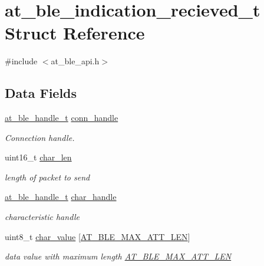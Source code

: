 \hypertarget{structat__ble__indication__recieved__t}{}\section{at\+\_\+ble\+\_\+indication\+\_\+recieved\+\_\+t Struct Reference}
\label{structat__ble__indication__recieved__t}


{\ttfamily \#include $<$at\+\_\+ble\+\_\+api.\+h$>$}

\subsection*{Data Fields}
\begin{DoxyCompactItemize}
\item 
\mbox{\hyperlink{at__ble__api_8h_abd23646d0c662860741f787efc8456f2}{at\+\_\+ble\+\_\+handle\+\_\+t}} \mbox{\hyperlink{structat__ble__indication__recieved__t_ae42df6fd8493f8f8faeccfdd6062e96f}{conn\+\_\+handle}}
\begin{DoxyCompactList}\small\item\em Connection handle. \end{DoxyCompactList}\item 
uint16\+\_\+t \mbox{\hyperlink{structat__ble__indication__recieved__t_a0fbd6e42ec188c22bdf8c86749e4e32e}{char\+\_\+len}}
\begin{DoxyCompactList}\small\item\em length of packet to send \end{DoxyCompactList}\item 
\mbox{\hyperlink{at__ble__api_8h_abd23646d0c662860741f787efc8456f2}{at\+\_\+ble\+\_\+handle\+\_\+t}} \mbox{\hyperlink{structat__ble__indication__recieved__t_abf2dd98b1df5d9471f3e18780eb5e5a7}{char\+\_\+handle}}
\begin{DoxyCompactList}\small\item\em characteristic handle \end{DoxyCompactList}\item 
uint8\+\_\+t \mbox{\hyperlink{structat__ble__indication__recieved__t_a3087f6044198797c737a35950732fbe7}{char\+\_\+value}} \mbox{[}\mbox{\hyperlink{at__ble__api_8h_aef91d9f37b950f3551cde0f9f5b01c50}{A\+T\+\_\+\+B\+L\+E\+\_\+\+M\+A\+X\+\_\+\+A\+T\+T\+\_\+\+L\+EN}}\mbox{]}
\begin{DoxyCompactList}\small\item\em data value with maximum length \mbox{\hyperlink{at__ble__api_8h_aef91d9f37b950f3551cde0f9f5b01c50}{A\+T\+\_\+\+B\+L\+E\+\_\+\+M\+A\+X\+\_\+\+A\+T\+T\+\_\+\+L\+EN}} \end{DoxyCompactList}\end{DoxyCompactItemize}


